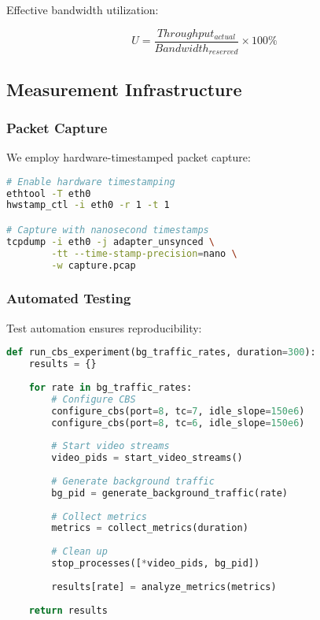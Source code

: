 \documentclass[10pt, journal, compsoc]{IEEEtran}
\begin{document}
Effective bandwidth utilization:

\begin{equation}
U = \frac{Throughput_{actual}}{Bandwidth_{reserved}} \times 100\%
\end{equation}

\subsection{Measurement Infrastructure}

\subsubsection{Packet Capture}

We employ hardware-timestamped packet capture:

\begin{lstlisting}[language=bash, caption=Packet Capture Setup]
# Enable hardware timestamping
ethtool -T eth0
hwstamp_ctl -i eth0 -r 1 -t 1

# Capture with nanosecond timestamps
tcpdump -i eth0 -j adapter_unsynced \
        -tt --time-stamp-precision=nano \
        -w capture.pcap
\end{lstlisting}

\subsubsection{Automated Testing}

Test automation ensures reproducibility:

\begin{lstlisting}[language=python, caption=Test Automation Script]
def run_cbs_experiment(bg_traffic_rates, duration=300):
    results = {}
    
    for rate in bg_traffic_rates:
        # Configure CBS
        configure_cbs(port=8, tc=7, idle_slope=150e6)
        configure_cbs(port=8, tc=6, idle_slope=150e6)
        
        # Start video streams
        video_pids = start_video_streams()
        
        # Generate background traffic
        bg_pid = generate_background_traffic(rate)
        
        # Collect metrics
        metrics = collect_metrics(duration)
        
        # Clean up
        stop_processes([*video_pids, bg_pid])
        
        results[rate] = analyze_metrics(metrics)
    
    return results
\end{lstlisting}
\end{document}
